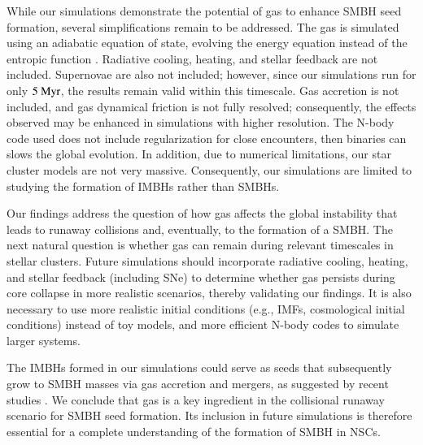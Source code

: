 While our simulations demonstrate the potential of gas to enhance SMBH seed formation, several simplifications remain to be addressed. The gas is simulated using an adiabatic equation of state, evolving the energy equation instead of the entropic function \citep{pelupessy2005numerical}. Radiative cooling, heating, and stellar feedback are not included. Supernovae are also not included; however, since our simulations run for only $5~{\rm Myr}$, the results remain valid within this timescale. Gas accretion is not included, and gas dynamical friction is not fully resolved; consequently, the effects observed may be enhanced in simulations with higher resolution. The N-body code used does not include regularization for close encounters, then binaries can slows the global evolution. In addition, due to numerical limitations, our star cluster models are not very massive. Consequently, our simulations are limited to studying the formation of IMBHs rather than SMBHs.

Our findings address the question of how gas affects the global instability that leads to runaway collisions and, eventually, to the formation of a SMBH. The next natural question is whether gas can remain during relevant timescales in stellar clusters. Future simulations should incorporate radiative cooling, heating, and stellar feedback (including SNe) to determine whether gas persists during core collapse in more realistic scenarios, thereby validating our findings. It is also necessary to use more realistic initial conditions (e.g., IMFs, cosmological initial conditions) instead of toy models, and more efficient N-body codes to simulate larger systems.

The IMBHs formed in our simulations could serve as seeds that subsequently grow to SMBH masses via gas accretion and mergers, as suggested by recent studies \citep{inayoshi2022rapid,kritos2023massive,chung2026dense}. We conclude that gas is a key ingredient in the collisional runaway scenario for SMBH seed formation. Its inclusion in future simulations is therefore essential for a complete understanding of the formation of SMBH in NSCs.




